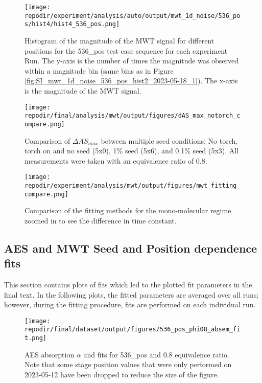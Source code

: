 \begin{figure}
    \centering
    \texttt{[image: \\repodir/experiment/analysis/auto/output/mwt\_1d\_noise/536\_pos/hist4/hist4\_536\_pos.png]} 
    \caption{Histogram of the magnitude of the MWT signal for different positions for the 536\_pos test case sequence for each experiment Run. The y-axis is the number of times the magnitude was observed within a magnitude bin (same bins as in Figure \ref{fig:SI_mwt_1d_noise_536_pos_hist2_2023-05-18_1}). The x-axis is the magnitude of the MWT signal.}
    \label{fig:SI_mwt_1d_noise_536_pos_hist4_hist4_536_pos}
\end{figure}

\begin{figure}[]
\centering
\texttt{[image: \\repodir/final/analysis/mwt/output/figures/dAS\_max\_notorch\_compare.png]}
\caption{Comparison of $\Delta AS_{max}$ between multiple seed conditions: No torch, torch on and no seed (5x0), 1\% seed (5x6), and 0.1\% seed (5x3). All measurements were taken with an equivalence ratio of 0.8.}
\end{figure}


\begin{figure}
\centering
\texttt{[image: \\repodir/experiment/analysis/mwt/output/figures/mwt\_fitting\_compare.png]}
\caption{Comparison of the fitting methods for the mono-molecular regime zoomed in to see the difference in time constant. }
\label{fig:SI_mwt_fitting_compare}
\end{figure}

\clearpage
\subsection{AES and MWT Seed and Position dependence fits}

This section contains plots of fits which led to the plotted fit parameters in the final text. In the following plots, the fitted parameters are averaged over all runs; however, during the fitting procedure, fits are performed on each individual run. 

\begin{figure}[]
\centering
\texttt{[image: \\repodir/final/dataset/output/figures/536\_pos\_phi08\_absem\_fit.png]}
\caption{AES absorption $\alpha$ and fits for 536\_pos and 0.8 equivalence ratio. Note that some stage position values that were only performed on 2023-05-12 have been dropped to reduce the size of the figure. }
\label{fig:SI_536_pos_phi08_absem_fit}
\end{figure}

